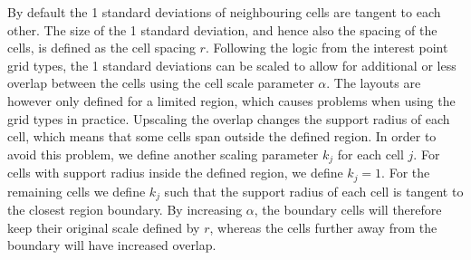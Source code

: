 \documentclass[thesis.tex]{subfiles}
\begin{document}
By default the 1 standard deviations of neighbouring cells are tangent to each other. The size of the 1 standard deviation, and hence also the spacing of the cells, is defined as the cell spacing $r$. Following the logic from the interest point grid types, the 1 standard deviations can be scaled to allow for additional or less overlap between the cells using the cell scale parameter $\alpha$.
The layouts are however only defined for a limited region, which causes problems when using the grid types in practice. Upscaling the overlap changes the support radius of each cell, which means that some cells span outside the defined region. In order to avoid this problem, we define another scaling parameter $k_j$ for each cell $j$. For cells with support radius inside the defined region, we define $k_j = 1$. For the remaining cells we define $k_j$ such that the support radius of each cell is tangent to the closest region boundary.
By increasing $\alpha$, the boundary cells will therefore keep their original scale defined by $r$, whereas the cells further away from the boundary will have increased overlap.
%
\end{document}

